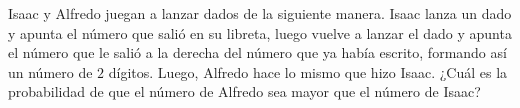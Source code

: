 Isaac y Alfredo juegan a lanzar dados de la siguiente manera. Isaac lanza un dado y apunta el número que salió en su libreta, luego vuelve a lanzar el dado y apunta el número que le salió a la derecha del número que ya había escrito, formando así un número de $2$ dígitos. Luego, Alfredo hace lo mismo que hizo Isaac. ¿Cuál es la probabilidad de que el número de Alfredo sea mayor que el número de Isaac?